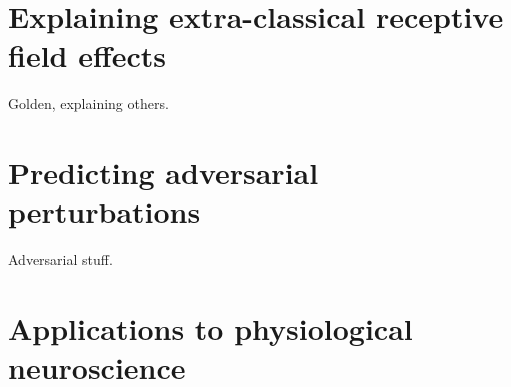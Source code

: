 \section{Explaining extra-classical receptive field effects}
Golden, explaining others.

\section{Predicting adversarial perturbations}
Adversarial stuff.

\section{Applications to physiological neuroscience}